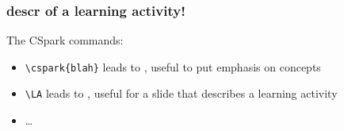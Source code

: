 
\begin{frame}[fragile]
    \frametitle{\LA descr of a learning activity!}

    The CSpark commands:

    \begin{itemize}
        \item \verb=\cspark{blah}= leads to , useful to put emphasis on concepts
        \item \verb=\LA= leads to \LA, useful for a slide that describes a learning activity
        \item \dots
    \end{itemize}

\end{frame}




